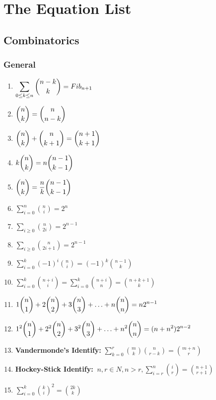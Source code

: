 \chapter{The Equation List}

\section{Combinatorics}

\subsection{General}
\begin{enumerate}
\item $\displaystyle \displaystyle \sum \limits_{0\leq k \leq n} {\binom{n-k}{k}} = Fib_{n+1}$
\item $\displaystyle \displaystyle {\binom{n}{k}}={\binom{n}{n-k}}$
\item $\displaystyle \displaystyle {\binom{n}{k}}+{\binom{n}{k+1}}={\binom{n+1}{k+1}}$
\item $\displaystyle \displaystyle k{\binom{n}{k}}=n{\binom{n-1}{k-1}}$
\item $\displaystyle \displaystyle {\binom{n}{k}}=\frac{n}{k}{\binom{n-1}{k-1}}$
\item $\displaystyle \sum \limits_{i=0}^n{\binom{n}{i}}=2^n$
\item $\displaystyle \sum \limits_{i\geq 0}{\binom{n}{2i}}=2^{n-1}$
\item $\displaystyle \sum \limits_{i\geq 0}{\binom{n}{2i+1}}=2^{n-1}$
\item $\displaystyle \sum \limits_{i= 0}^k \left( -1 \right) ^i{\binom{n}{i}}=\left( -1 \right) ^k{\binom{n-1}{k}}$
\item $\displaystyle \sum \limits_{i= 0}^k{\binom{n+i}{i}}= \sum \limits_{i= 0}^k{\binom{n+i}{n}} = {\binom{n+k+1}{k}}$
\item $\displaystyle \displaystyle1{\binom{n}{1}}+2{\binom{n}{2}}+3{\binom{n}{3}}+ \ldots +n{\binom{n}{n}}=n2^{n-1}$
\item $\displaystyle \displaystyle1^2{\binom{n}{1}}+2^2{\binom{n}{2}}+3^2{\binom{n}{3}}+ \ldots +n^2{\binom{n}{n}}=(n+n^2)2^{n-2}$
\item \textbf{Vandermonde's Identify:} $\displaystyle \sum \limits_{k=0}^r{\binom{m}{k}}{\binom{n}{r-k}}={\binom{m+n}{r}}$
\item \textbf{Hockey-Stick Identify:} $\displaystyle \ n,r \in N, n > r, \sum \limits_{i=r}^n{\binom{i}{r}}={\binom{n+1}{r+1}}$
\item $\displaystyle \sum \limits_{i=0}^k{\binom{k}{i}}^2={\binom{2k}{k}}$


\end{enumerate}
